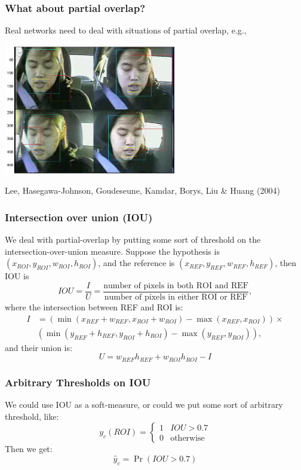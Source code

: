 \documentclass{beamer}
\begin{document}
\begin{frame}
  \frametitle{What about partial overlap?}

  Real networks need to deal with situations of partial overlap, e.g., 
  \centerline{\includegraphics[height=2.25in]{figs/avicar_rects.png}}
  \begin{tiny}Lee, Hasegawa-Johnson, Goudeseune, Kamdar, Borys, Liu \& Huang (2004)\end{tiny}
\end{frame}


\begin{frame}
  \frametitle{Intersection  over union (IOU)}
  
  We deal with partial-overlap by putting some sort of threshold on
  the intersection-over-union measure.  Suppose the hypothesis is
  $(x_{ROI},y_{ROI},w_{ROI},h_{ROI})$, and the reference is
  $(x_{REF},y_{REF},w_{REF},h_{REF})$, then IOU is
  \begin{displaymath}
    IOU =\frac{I}{U}=
    \frac{\mbox{number of pixels in both ROI and REF}}{\mbox{number of pixels in either ROI or REF}},
  \end{displaymath}
  where the intersection between REF  and ROI is:
  \begin{align*}
    I &= \left(\min\left(x_{REF}+w_{REF},x_{ROI}+w_{ROI}\right)-\max\left(x_{REF},x_{ROI}\right)\right)
    \times\\
    &\left(\min\left(y_{REF}+h_{REF},y_{ROI}+h_{ROI}\right)-\max\left(y_{REF},y_{ROI}\right)\right),
  \end{align*}
  and their union is:
  \begin{displaymath}
    U = w_{REF}h_{REF}+w_{ROI}h_{ROI}-I
  \end{displaymath}
\end{frame}

\begin{frame}
  \frametitle{Arbitrary  Thresholds on IOU}
  
  We could use IOU as a soft-measure, or could we put some sort of
  arbitrary threshold, like:
  \[
  y_c(ROI) = \begin{cases}
    1 & IOU>0.7\\
    0 & \mbox{otherwise}
  \end{cases}
  \]
  Then we get:
  \[
  \hat{y}_c=\Pr\left(IOU > 0.7\right)
  \]
\end{frame}
\end{document}
